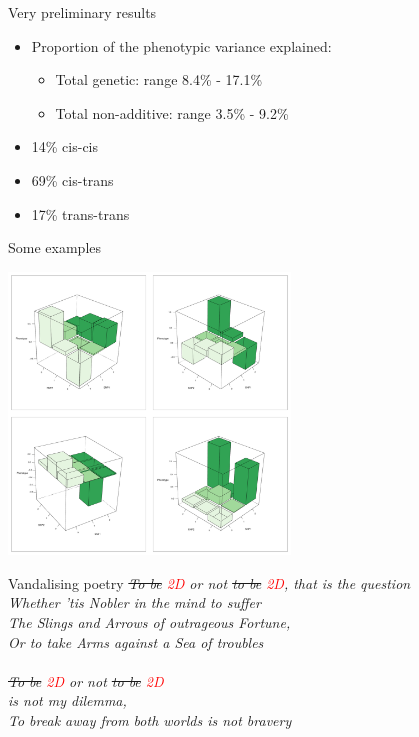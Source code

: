 \documentclass{beamer}
\begin{document}
\begin{frame}{Very preliminary results}
\begin{itemize}
\item Proportion of the phenotypic variance explained:
\begin{itemize}
\item Total genetic: range 8.4\% - 17.1\%
\item Total non-additive: range 3.5\% - 9.2\%
\end{itemize}
\item 14\% cis-cis
\item 69\% cis-trans
\item 17\% trans-trans
\end{itemize}
\end{frame}

\begin{frame}{Some examples}
\begin{center}
\includegraphics[height=7.5cm]{epistasis_examples}
\end{center}
\end{frame}



\begin{frame}{Vandalising poetry}
\emph{\sout{To be} \textcolor{red}{2D} or not \sout{to be} \textcolor{red}{2D}, that is the question \\
Whether 'tis Nobler in the mind to suffer \\
The Slings and Arrows of outrageous Fortune, \\
Or to take Arms against a Sea of troubles} \\
\hspace{1cm}{\tiny - William Shakespeare, 1623} \\
\vspace{0.5in}
\pause
\emph{\sout{To be} \textcolor{red}{2D} or not \sout{to be} \textcolor{red}{2D} \\
is not my dilemma, \\
To break away from both worlds is not bravery} \\
\hspace{1cm}{\tiny - Rumi, 13th century} \\
\end{frame}
\end{document}
